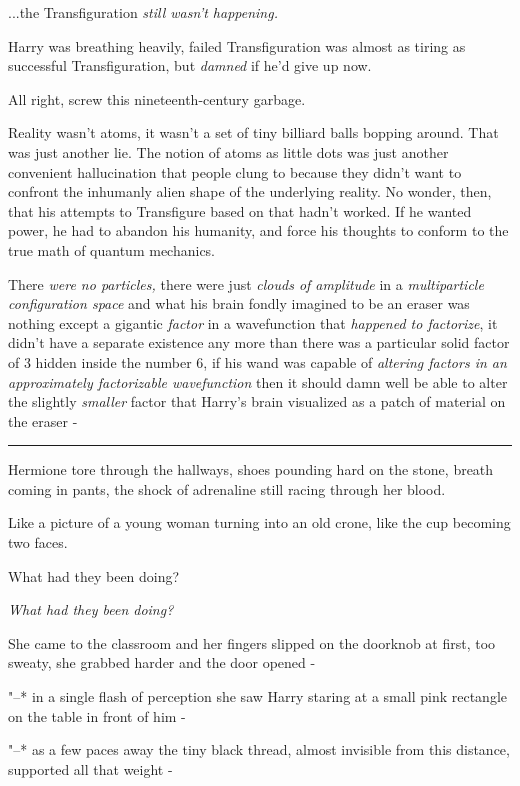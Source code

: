 ...the Transfiguration \emph{still wasn't happening.}

Harry was breathing heavily, failed Transfiguration was almost as tiring
as successful Transfiguration, but \emph{damned} if he'd give up now.

All right, screw this nineteenth-century garbage.

Reality wasn't atoms, it wasn't a set of tiny billiard balls bopping
around. That was just another lie. The notion of atoms as little dots
was just another convenient hallucination that people clung to because
they didn't want to confront the inhumanly alien shape of the underlying
reality. No wonder, then, that his attempts to Transfigure based on that
hadn't worked. If he wanted power, he had to abandon his humanity, and
force his thoughts to conform to the true math of quantum mechanics.

There \emph{were no particles,} there were just \emph{clouds of
amplitude} in a \emph{multiparticle configuration space} and what his
brain fondly imagined to be an eraser was nothing except a gigantic
\emph{factor} in a wavefunction that \emph{happened to factorize}, it
didn't have a separate existence any more than there was a particular
solid factor of 3 hidden inside the number 6, if his wand was capable of
\emph{altering factors in an approximately factorizable wavefunction}
then it should damn well be able to alter the slightly \emph{smaller}
factor that Harry's brain visualized as a patch of material on the
eraser -

\begin{center}\rule{3in}{0.4pt}\end{center}

Hermione tore through the hallways, shoes pounding hard on the stone,
breath coming in pants, the shock of adrenaline still racing through her
blood.

Like a picture of a young woman turning into an old crone, like the cup
becoming two faces.

What had they been doing?

\emph{What had they been doing?}

She came to the classroom and her fingers slipped on the doorknob at
first, too sweaty, she grabbed harder and the door opened -

"--* in a single flash of perception she saw Harry staring at a small pink
rectangle on the table in front of him -

"--* as a few paces away the tiny black thread, almost invisible from this
distance, supported all that weight -

